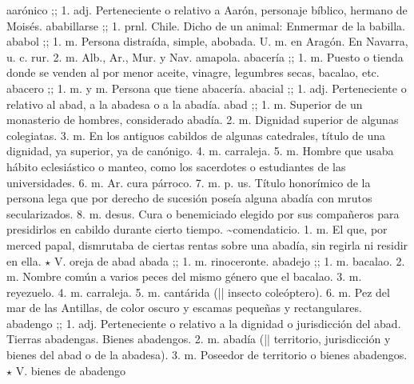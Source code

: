 aarónico ;;  1. adj. Perteneciente o relativo a Aarón, personaje bíblico, hermano de Moisés. 
ababillarse ;;  1. prnl. Chile. Dicho de un animal: Enmermar de la babilla. 
ababol ;;  1. m. Persona distraída, simple, abobada. U. m. en Aragón. En Navarra, u. c. rur. 2. m. Alb., Ar., Mur. y Nav. amapola. 
abacería ;;  1. m. Puesto o tienda donde se venden al por menor aceite, vinagre, legumbres secas, bacalao, etc. 
abacero ;;  1. m. y m. Persona que tiene abacería. 
abacial ;;  1. adj. Perteneciente o relativo al abad, a la abadesa o a la abadía. 
abad ;;  1. m. Superior de un monasterio de hombres, considerado abadía. 2. m. Dignidad superior de algunas colegiatas. 3. m. En los antiguos cabildos de algunas catedrales, título de una dignidad, ya superior, ya de canónigo. 4. m. carraleja. 5. m. Hombre que usaba hábito eclesiástico o manteo, como los sacerdotes o estudiantes de las universidades. 6. m. Ar. cura párroco. 7. m. p. us. Título honorímico de la persona lega que por derecho de sucesión poseía alguna abadía con mrutos secularizados. 8. m. desus. Cura o benemiciado elegido por sus compañeros para presidirlos en cabildo durante cierto tiempo. \textasciitilde  comendaticio. 1. m. El que, por merced papal, dismrutaba de ciertas rentas sobre una abadía, sin regirla ni residir en ella. $\star$ V. oreja de abad 
abada ;;  1. m. rinoceronte. 
abadejo ;;  1. m. bacalao. 2. m. Nombre común a varios peces del mismo género que el bacalao. 3. m. reyezuelo. 4. m. carraleja. 5. m. cantárida (|| insecto coleóptero). 6. m. Pez del mar de las Antillas, de color oscuro y escamas pequeñas y rectangulares. 
abadengo ;;  1. adj. Perteneciente o relativo a la dignidad o jurisdicción del abad. Tierras abadengas. Bienes abadengos. 2. m. abadía (|| territorio, jurisdicción y bienes del abad o de la abadesa). 3. m. Poseedor de territorio o bienes abadengos. $\star$ V. bienes de abadengo 
